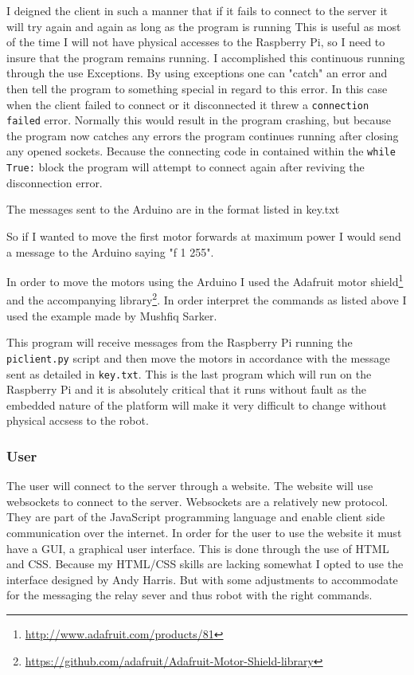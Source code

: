 \documentclass[]{report}   %
\begin{document}
						I deigned the client in such a manner that if it fails to connect to the server it will try again and again as long as the program is running
						This is useful as most of the time I will not have physical accesses to the Raspberry Pi, so I need to insure that the program remains running.
						I accomplished this continuous running through the use Exceptions. By using exceptions one can "catch" an error and then tell the program to
						something special in regard to this error. In this case when the client failed to connect or it disconnected it threw a
						\lstinline{connection failed} error. Normally this would result in the program crashing, but because the program now catches any errors the program
						continues running after closing any opened sockets. Because the connecting code in contained within the \lstinline{while True:} block the program will
						attempt to connect again after reviving the disconnection error.
						
						The messages sent to the Arduino are in the format listed in key.txt
						
						
						So if I wanted to move the first motor forwards at maximum power I would send a message to the Arduino saying "f 1 255".
						
						In order to move the motors using the Arduino I used the Adafruit motor shield\footnote{\url{http://www.adafruit.com/products/81}} and the
						accompanying library\footnote{\url{https://github.com/adafruit/Adafruit-Motor-Shield-library}}. In order interpret the commands as listed
						above I used the example made by Mushfiq Sarker\cite{serialread}.
						
						
						This program will receive messages from the Raspberry Pi running the \lstinline{piclient.py} script and then move the motors in accordance
						with the message sent as detailed in \lstinline{key.txt}. This is the last program which will run on the Raspberry Pi and it is absolutely
						critical that it runs without fault as the embedded nature of the platform will make it very difficult to change without physical accsess
						to the robot.

					\subsubsection{User}
						The user will connect to the server through a website. The website will use websockets to connect to the server. Websockets are a
						relatively new protocol. They are part of the JavaScript programming language and enable client side communication over the internet.
						In order for the user to use the website it must have a GUI, a graphical user interface. This is done through the use of HTML and 
						CSS. Because my HTML/CSS skills are lacking somewhat I opted to use the interface designed by Andy Harris\cite{dummies}.
						But with some adjustments to accommodate for the messaging the relay sever and thus robot with the right commands.
						
						
\end{document}
